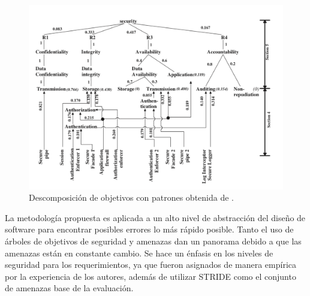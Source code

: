 \begin{figure}[!h]
  \centering
    \includegraphics[scale=0.45]{Imagenes/fig_reqTree.png}
    \caption{Descomposición de objetivos con patrones obtenida de \cite{YauScaHey}.}
    \label{fig:reqTree}
\end{figure}

\vspace{0.3cm}

La metodología propuesta es aplicada a un alto nivel de abstracción del diseño de software para encontrar posibles errores lo más rápido posible. Tanto el uso de árboles de objetivos de seguridad y amenazas dan un panorama debido a que las amenazas están en constante cambio. Se hace un énfasis en los niveles de seguridad para los requerimientos, ya que fueron asignados de manera empírica por la experiencia de los autores, además de utilizar STRIDE como el conjunto de amenazas base de la evaluación. 


%
%
%
%
